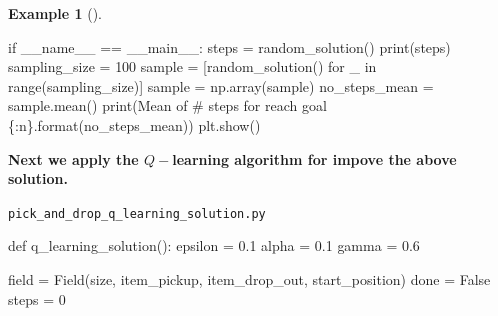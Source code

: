 \documentclass[
  letterpaper,
]{krantz}
\makeatletter
\newenvironment{Shaded}{\begin{snugshade}}{\end{snugshade}}
\newcommand{\BuiltInTok}[1]{\textcolor[rgb]{0.00,0.23,0.31}{#1}}
\newcommand{\ControlFlowTok}[1]{\textcolor[rgb]{0.00,0.23,0.31}{#1}}
\newcommand{\DecValTok}[1]{\textcolor[rgb]{0.68,0.00,0.00}{#1}}
\newcommand{\FloatTok}[1]{\textcolor[rgb]{0.68,0.00,0.00}{#1}}
\newcommand{\KeywordTok}[1]{\textcolor[rgb]{0.00,0.23,0.31}{#1}}
\newcommand{\NormalTok}[1]{\textcolor[rgb]{0.00,0.23,0.31}{#1}}
\newcommand{\OperatorTok}[1]{\textcolor[rgb]{0.37,0.37,0.37}{#1}}
\newcommand{\SpecialCharTok}[1]{\textcolor[rgb]{0.37,0.37,0.37}{#1}}
\newcommand{\StringTok}[1]{\textcolor[rgb]{0.13,0.47,0.30}{#1}}
\newcommand{\VariableTok}[1]{\textcolor[rgb]{0.07,0.07,0.07}{#1}}
\newenvironment{kframe}{%
\medskip{}
\setlength{\fboxsep}{.8em}
 \def\at@end@of@kframe{}%
 \ifinner\ifhmode%
  \def\at@end@of@kframe{\end{minipage}}%
  \begin{minipage}{\columnwidth}%
 \fi\fi%
 \def\FrameCommand##1{\hskip\@totalleftmargin \hskip-\fboxsep
 \colorbox{shadecolor}{##1}\hskip-\fboxsep
     \hskip-\linewidth \hskip-\@totalleftmargin \hskip\columnwidth}%
 \MakeFramed {\advance\hsize-\width
   \@totalleftmargin\z@ \linewidth\hsize
   \@setminipage}}%
 {\par\unskip\endMakeFramed%
 \at@end@of@kframe}
\renewenvironment{Shaded}{\begin{kframe}}{\end{kframe}}
\theoremstyle{plain}
\theoremstyle{definition}
\newtheorem{example}{Example}[chapter]
\theoremstyle{definition}
\theoremstyle{remark}
\makeatother
\begin{document}
\begin{example}[]
\begin{tcolorbox}[enhanced jigsaw, bottomrule=.15mm, opacityback=0, breakable, colframe=quarto-callout-tip-color-frame, left=2mm, rightrule=.15mm, toprule=.15mm, leftrule=.75mm, arc=.35mm, colback=white]
\begin{codelisting}[H]
\begin{Shaded}
\begin{Highlighting}[]
\ControlFlowTok{if} \VariableTok{\_\_name\_\_} \OperatorTok{==} \StringTok{\textquotesingle{}\_\_main\_\_\textquotesingle{}}\NormalTok{:}
\NormalTok{    steps }\OperatorTok{=}\NormalTok{ random\_solution()}
    \BuiltInTok{print}\NormalTok{(steps)}
\NormalTok{    sampling\_size }\OperatorTok{=} \DecValTok{100}
\NormalTok{    sample }\OperatorTok{=}\NormalTok{ [random\_solution() }\ControlFlowTok{for}\NormalTok{ \_ }\KeywordTok{in} \BuiltInTok{range}\NormalTok{(sampling\_size)]}
\NormalTok{    sample }\OperatorTok{=}\NormalTok{ np.array(sample)}
\NormalTok{    no\_steps\_mean }\OperatorTok{=}\NormalTok{ sample.mean()}
    \BuiltInTok{print}\NormalTok{(}\StringTok{\textquotesingle{}Mean of \# steps for reach goal }\SpecialCharTok{\{:n\}}\StringTok{\textquotesingle{}}\NormalTok{.}\BuiltInTok{format}\NormalTok{(no\_steps\_mean))}
\NormalTok{    plt.show()}
\end{Highlighting}
\end{Shaded}

\end{codelisting}

\end{tcolorbox}

\begin{tcolorbox}[enhanced jigsaw, bottomrule=.15mm, opacityback=0, breakable, colframe=quarto-callout-tip-color-frame, left=2mm, rightrule=.15mm, toprule=.15mm, leftrule=.75mm, arc=.35mm, colback=white]

\vspace{-3mm}\textbf{Next we apply the \(Q-\)learning algorithm for impove the above
solution.}\vspace{3mm}

\begin{codelisting}[H]

\caption{\texttt{pick\_and\_drop\_q\_learning\_solution.py}}

\begin{Shaded}
\begin{Highlighting}[]
    \KeywordTok{def}\NormalTok{ q\_learning\_solution():}
\NormalTok{    epsilon }\OperatorTok{=} \FloatTok{0.1}
\NormalTok{    alpha }\OperatorTok{=} \FloatTok{0.1}
\NormalTok{    gamma }\OperatorTok{=} \FloatTok{0.6}
    
\NormalTok{    field }\OperatorTok{=}\NormalTok{ Field(size, item\_pickup, item\_drop\_out, start\_position)}
\NormalTok{    done }\OperatorTok{=} \VariableTok{False}
\NormalTok{    steps }\OperatorTok{=} \DecValTok{0}
    

\end{Highlighting}
\end{Shaded}
\end{codelisting}
\end{tcolorbox}
\end{example}
\end{document}
